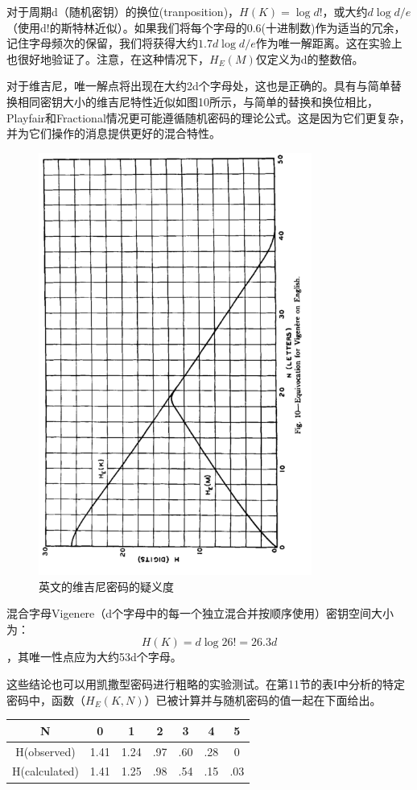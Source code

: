 \documentclass[]{article}
\begin{document}
对于周期d（随机密钥）的换位(tranposition)，$H(K)=\log{d!}$，或大约$d\log{d/e}$（使用d!的斯特林近似）。如果我们将每个字母的0.6(十进制数)作为适当的冗余，记住字母频次的保留，我们将获得大约$1.7d\log{d/e}$作为唯一解距离。这在实验上也很好地验证了。注意，在这种情况下，$H_E(M)$仅定义为d的整数倍。

对于维吉尼，唯一解点将出现在大约2d个字母处，这也是正确的。具有与简单替换相同密钥大小的维吉尼特性近似如图10所示，与简单的替换和换位相比，Playfair和Fractional情况更可能遵循随机密码的理论公式。这是因为它们更复杂，并为它们操作的消息提供更好的混合特性。

\begin{figure}[htbp]
	\centering
	\includegraphics[width=0.8\textwidth]{fig10.png}
	\caption{英文的维吉尼密码的疑义度}
	\label{fig:fig10}
\end{figure}

混合字母Vigenere（d个字母中的每一个独立混合并按顺序使用）密钥空间大小为：
\[H(K)=d\log{26!}=26.3d\]
，其唯一性点应为大约53d个字母。

这些结论也可以用凯撒型密码进行粗略的实验测试。在第11节的表I中分析的特定密码中，函数（$H_E(K,N)$）已被计算并与随机密码的值一起在下面给出。\\
\begin{table}
	\centering
	\begin{tabular}{c|c|c|c|c|c|c}
		\hline 
		N& 0 & 1 & 2 & 3 & 4 & 5 \\ 
		\hline 
		H(observed)& 1.41 & 1.24 & .97 & .60 & .28 & 0 \\ 
		\hline 
		H(calculated)& 1.41 & 1.25 & .98 & .54 & .15 & .03 \\ 
		\hline 
	\end{tabular} 
\end{table}
\end{document}
